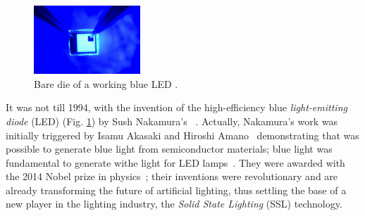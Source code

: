 \begin{figure}[!h]
\centering
\includegraphics[width=4cm]{./0_intro/img/10-7-14-nobel-prize-blue-led.jpg}
\caption{Bare die of a working blue LED  .}
\label{fig:blue_LED}
\end{figure}

It was not till 1994, with the invention of the high-efficiency blue \emph{light-emitting diode} (LED) (Fig. \ref{fig:blue_LED}) by Sush Nakamura's ~\cite{94Nakamura}. Actually, Nakamura's work was initially triggered by Isamu Akasaki and Hiroshi Amano~\cite{94akasaki} demonstrating that was possible to generate blue light from semiconductor materials; blue light was fundamental to generate withe light for LED lamps~\cite{02narukawa}. They were awarded with the 2014 Nobel prize in physics~\cite{14NobelPhy}; their inventions were revolutionary and are already transforming the future of artificial lighting, thus settling the base of a new player in the lighting industry, the \emph{Solid State Lighting} (SSL) technology.

